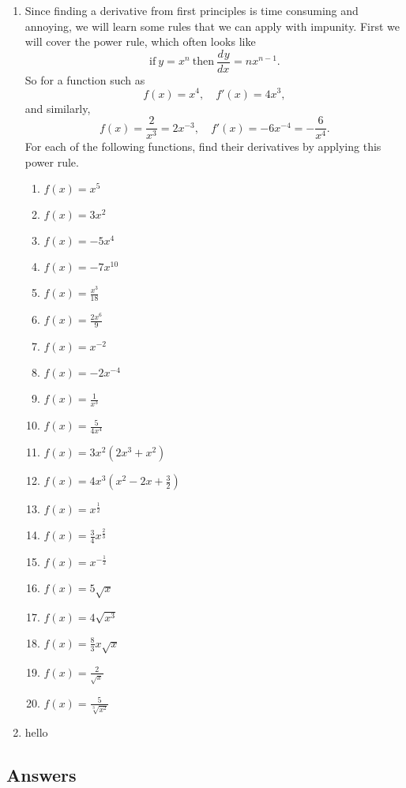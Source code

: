 \documentclass[a4paper,12pt]{article}
\newcommand{\deriv}[3][]{\frac{d^{#1}#2}{d#3^{#1}}}
\begin{document}
\begin{enumerate}
\item Since finding a derivative from first principles is time consuming and 
annoying, we will learn some rules that we can apply with impunity. First 
we will cover the power rule, which often looks like
$$\mathrm{if~} y = x^n \mathrm{~then~} \deriv{y}{x} = nx^{n - 1}.$$
So for a function such as 
$$f(x) = x^4,\quad f'(x) = 4x^3,$$
and similarly,
$$f(x) = \frac{2}{x^3} = 2x^{-3}, \quad f'(x) = -6x^{-4} = -\frac{6}{x^4}.$$
For each of the following functions, find their derivatives by applying 
this power rule.
    \begin{multicols}{2}
    \begin{enumerate}
    \item $f(x) = x^5$
    \item $f(x) = 3x^2$
    \item $f(x) = -5x^4$
    \item $f(x) = -7x^{10}$
    \item $f(x) = \frac{x^3}{18}$
    \item $f(x) = \frac{2x^6}{9}$
    \item $f(x) = x^{-2}$
    \item $f(x) = -2x^{-4}$
    \item $f(x) = \frac{1}{x^3}$
    \item $f(x) = \frac{5}{4x^4}$
    \item $f(x) = 3x^2(2x^3 + x^2)$
    \item $f(x) = 4x^3\left(x^2 - 2x + \frac{3}{2}\right)$
    \item $f(x) = x^{\frac{1}{2}}$
    \item $f(x) = \frac{3}{4}x^{\frac{2}{3}}$
    \item $f(x) = x^{-\frac{1}{2}}$
    \item $f(x) = 5\sqrt{x}$
    \item $f(x) = 4\sqrt{x^3}$
    \item $f(x) = \frac{8}{3}x\sqrt{x}$
    \item $f(x) = \frac{2}{\sqrt{x}}$
    \item $f(x) = \frac{5}{\sqrt[3]{x^2}}$
    \end{enumerate}
    \end{multicols}

\newpage
\item hello
\end{enumerate}
\newpage
\subsection*{Answers}
\end{document}
